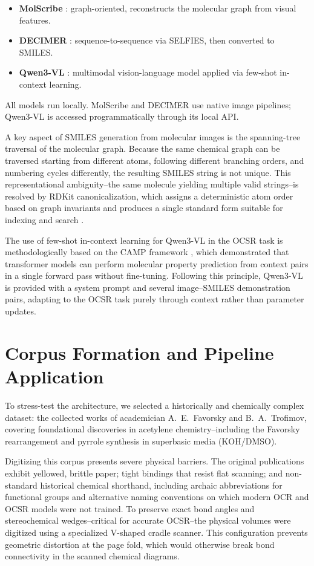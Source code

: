 \documentclass[conference]{IEEEtran}
\begin{document}
\begin{itemize}
\item \textbf{MolScribe} \cite{ref8}: graph-oriented, reconstructs the molecular graph from visual features.
\item \textbf{DECIMER} \cite{ref9,ref10}: sequence-to-sequence via SELFIES, then converted to SMILES.
\item \textbf{Qwen3-VL} \cite{ref11}: multimodal vision-language model applied via few-shot in-context learning.
\end{itemize}

All models run locally. MolScribe and DECIMER use native image pipelines; Qwen3-VL is accessed programmatically through its local API.

A key aspect of SMILES generation from molecular images is the spanning-tree traversal of the molecular graph. Because the same chemical graph can be traversed starting from different atoms, following different branching orders, and numbering cycles differently, the resulting SMILES string is not unique. This representational ambiguity--the same molecule yielding multiple valid strings--is resolved by RDKit canonicalization, which assigns a deterministic atom order based on graph invariants and produces a single standard form suitable for indexing and search \cite{ref21,ref20}.

The use of few-shot in-context learning for Qwen3-VL in the OCSR task is methodologically based on the CAMP framework \cite{ref22}, which demonstrated that transformer models can perform molecular property prediction from context pairs in a single forward pass without fine-tuning. Following this principle, Qwen3-VL is provided with a system prompt and several image--SMILES demonstration pairs, adapting to the OCSR task purely through context rather than parameter updates.

\section{Corpus Formation and Pipeline Application}

To stress-test the architecture, we selected a historically and chemically complex dataset: the collected works of academician A.~E.~Favorsky and B.~A.~Trofimov, covering foundational discoveries in acetylene chemistry--including the Favorsky rearrangement and pyrrole synthesis in superbasic media (KOH/DMSO).

Digitizing this corpus presents severe physical barriers. The original publications exhibit yellowed, brittle paper; tight bindings that resist flat scanning; and non-standard historical chemical shorthand, including archaic abbreviations for functional groups and alternative naming conventions on which modern OCR and OCSR models were not trained. To preserve exact bond angles and stereochemical wedges--critical for accurate OCSR--the physical volumes were digitized using a specialized V-shaped cradle scanner. This configuration prevents geometric distortion at the page fold, which would otherwise break bond connectivity in the scanned chemical diagrams.
\end{document}
